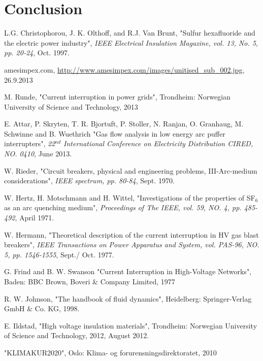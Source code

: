 \documentclass[10pt,b5paper,twoside]{article}
\begin{document}
\section{Conclusion}


\cleardoublepage
\begin{thebibliography}{10}
 L.G. Christophorou, J. K. Olthoff, and R.J. Van Brunt, "Sulfur hexafluoride and the electric power industry", \textit{IEEE Electrical Insulation Magazine, vol. 13, No. 5, pp. 20-24}, Oct. 1997.

 amesimpex.com, \url{http://www.amesimpex.com/images/unitised_sub_002.jpg}, 26.9.2013

 M. Runde, "Current interruption in power grids", Trondheim: Norwegian University of Science and Technology, 2013

 E. Attar, P. Skryten, T. R. Bjortuft, P. Stoller, N. Ranjan, O. Granhaug, M. Schwinne and B. Wuethrich "Gas flow analysis in low energy arc puffer interrupters", \textit{22$^{nd}$ International Conference on Electricity Distribution CIRED, NO. 0410}, June 2013.

 W. Rieder, "Circuit breakers, physical and engineering problems, III-Arc-medium considerations", \textit{IEEE spectrum, pp. 80-84}, Sept. 1970.

 W. Hertz, H. Motschmann and H. Wittel, "Investigations of the properties of SF$_6$ as an arc quenching medium", \textit{Proceedings of The IEEE, vol. 59, NO. 4, pp. 485-492}, April 1971.

 W. Hermann, "Theoretical description of the current interruption in HV gas blast breakers", \textit{IEEE Transactions on Power Apparatus and System, vol. PAS-96, NO. 5, pp. 1546-1555}, Sept./ Oct. 1977.

 G. Frind and B. W. Swanson "Current Interruption in High-Voltage Networks", Baden: BBC Brown, Boveri \& Company Limited, 1977

 R. W. Johnson, "The handbook of fluid dynamics", Heidelberg: Springer-Verlag GmbH \& Co. KG, 1998.

 E. Ildstad, "High voltage insulation materials", Trondheim: Norwegian University of Science and Technology, 2012, August 2012.

 "KLIMAKUR2020", Oslo: Klima- og forurensningsdirektoratet, 2010


\end{thebibliography}
\end{document}
